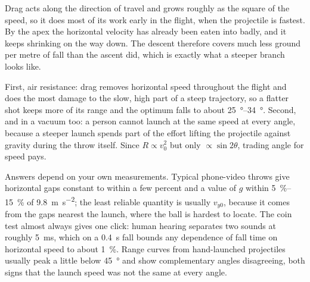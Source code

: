 \documentclass[11pt,twoside,openany]{book}
\begin{document}
\begin{description}[leftmargin=2.6em,itemsep=3pt,style=sameline]
  \item[3.50] Drag acts along the direction of travel and grows roughly as the square of the speed, so it does most of its work early in the flight, when the projectile is fastest. By the apex the horizontal velocity has already been eaten into badly, and it keeps shrinking on the way down. The descent therefore covers much less ground per metre of fall than the ascent did, which is exactly what a steeper branch looks like.
  \item[3.51] First, air resistance: drag removes horizontal speed throughout the flight and does the most damage to the slow, high part of a steep trajectory, so a flatter shot keeps more of its range and the optimum falls to about \SIrange{25}{34}{\degree}. Second, and in a vacuum too: a person cannot launch at the same speed at every angle, because a steeper launch spends part of the effort lifting the projectile against gravity during the throw itself. Since $R \propto v_0^2$ but only $\propto \sin2\theta$, trading angle for speed pays.
  \item[3.52--3.56] Answers depend on your own measurements. Typical phone-video throws give horizontal gaps constant to within a few percent and a value of $g$ within \SIrange{5}{15}{\percent} of \SI{9.8}{\metre\per\second\squared}; the least reliable quantity is usually $v_{y0}$, because it comes from the gaps nearest the launch, where the ball is hardest to locate. The coin test almost always gives one click: human hearing separates two sounds at roughly \SI{5}{\milli\second}, which on a \SI{0.4}{\second} fall bounds any dependence of fall time on horizontal speed to about \SI{1}{\percent}. Range curves from hand-launched projectiles usually peak a little below \SI{45}{\degree} and show complementary angles disagreeing, both signs that the launch speed was not the same at every angle.
\end{description}
\end{document}
